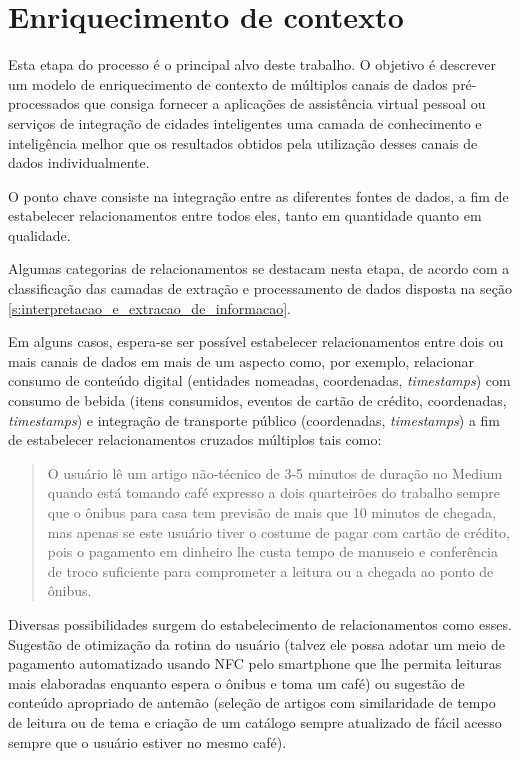 \chapter{Enriquecimento de contexto}

Esta etapa do processo é o principal alvo deste trabalho. O objetivo é descrever um modelo de enriquecimento de contexto de múltiplos canais de dados pré-processados que consiga fornecer a aplicações de assistência virtual pessoal ou serviços de integração de cidades inteligentes uma camada de conhecimento e inteligência melhor que os resultados obtidos pela utilização desses canais de dados individualmente.

O ponto chave consiste na integração entre as diferentes fontes de dados, a fim de estabelecer relacionamentos entre todos eles, tanto em quantidade quanto em qualidade.

Algumas categorias de relacionamentos se destacam nesta etapa, de acordo com a classificação das camadas de extração e processamento de dados disposta na seção \ref{s:interpretacao_e_extracao_de_informacao}.

Em alguns casos, espera-se ser possível estabelecer relacionamentos entre dois ou mais canais de dados em mais de um aspecto como, por exemplo, relacionar consumo de conteúdo digital (entidades nomeadas, coordenadas, \textit{timestamps}) com consumo de bebida (itens consumidos, eventos de cartão de crédito, coordenadas, \textit{timestamps}) e integração de transporte público (coordenadas, \textit{timestamps}) a fim de estabelecer relacionamentos cruzados múltiplos tais como:
\begin{quote}
    O usuário lê um artigo não-técnico de 3-5 minutos de duração no Medium quando está tomando café expresso a dois quarteirões do trabalho sempre que o ônibus para casa tem previsão de mais que 10 minutos de chegada, mas apenas se este usuário tiver o costume de pagar com cartão de crédito, pois o pagamento em dinheiro lhe custa tempo de manuseio e conferência de troco suficiente para comprometer a leitura ou a chegada ao ponto de ônibus.
\end{quote}

Diversas possibilidades surgem do estabelecimento de relacionamentos como esses. Sugestão de otimização da rotina do usuário (talvez ele possa adotar um meio de pagamento automatizado usando NFC pelo smartphone que lhe permita leituras mais elaboradas enquanto espera o ônibus e toma um café) ou sugestão de conteúdo apropriado de antemão (seleção de artigos com similaridade de tempo de leitura ou de tema e criação de um catálogo sempre atualizado de fácil acesso sempre que o usuário estiver no mesmo café).

